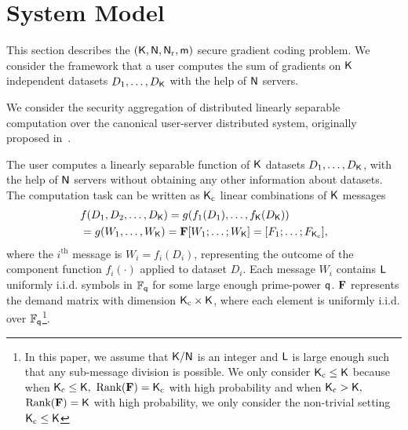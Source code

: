 \documentclass[conference,letterpaper]{IEEEtran}
\begin{document}
\section{System Model}
\label{sec:system}
This section describes   the $({\sf K},{\sf N},{\sf N}_{\rm r}, {\sf m})$ secure gradient coding problem. 
We consider the framework that a user computes the sum of gradients on ${\sf K}$ independent datasets $D_1,\ldots, D_{{\sf K}}$ with the help of ${\sf N}$ servers. %

\iffalse
We consider the security aggregation of distributed linearly separable computation over the canonical user-server distributed system, originally proposed in~\cite{wan2022secure}. 

The user computes a linearly separable function of ${\sf K}$  datasets $D_1, \ldots, D_{{\sf K}}$, with the help of ${\sf N}$ servers without obtaining any other information about datasets. The computation task can be written as ${\sf K}_{\rm c}$ linear combinations of ${\sf K}$ messages
\begin{align}
    &f({D_1},{D_2}, \ldots ,{D_{{\sf K}}}) = g({f_1}({D_1}), \ldots ,{f_{{\sf K}}}({D_{{\sf K}}}))  \nonumber\\
    &= g({W_1}, \ldots ,{W_{{\sf K}}}) = {\bf F}[{W_1}; \ldots ;{W_{\sf K}}] = [{F_1};\ldots;{F_{{\sf K}_{\rm c}}}], \label{eq:computation task}
\end{align}
where the $i^{\text{th}}$ message is  ${W_i} = {f_i}({D_i}) $, representing  the outcome of the  component function $f_i(\cdot)$ applied to dataset $D_i$. Each message $W_i$ contains ${\sf L}$ uniformly i.i.d. symbols in $\mathbb{F}_{{\sf q}}$ for some large enough prime-power ${\sf q}$. ${\bf F}$ represents the demand matrix with dimension ${\sf K}_{\rm c} \times {\sf K}$, where each element is uniformly i.i.d. over $\mathbb{F}_{{\sf q}}$\footnote{\label{foot:L large}In this paper, we assume that  ${\sf K}/{\sf N}$ is an integer and  ${\sf L}$ is large enough such
that any sub-message division is possible. We only consider ${\sf K}_{\rm c} \leq {\sf K}$ because when ${\sf K}_{\rm c} \le {\sf K},$  $\text{Rank}({\bf F}) = {\sf K}_{\rm c}$ with high probability and when ${\sf K}_{\rm c} > {\sf K},$ $\text{Rank}({\bf F}) = {\sf K}$ with high probability, we only consider the non-trivial setting ${\sf K}_{\rm c} \le {\sf K}$}. 
\end{document}
